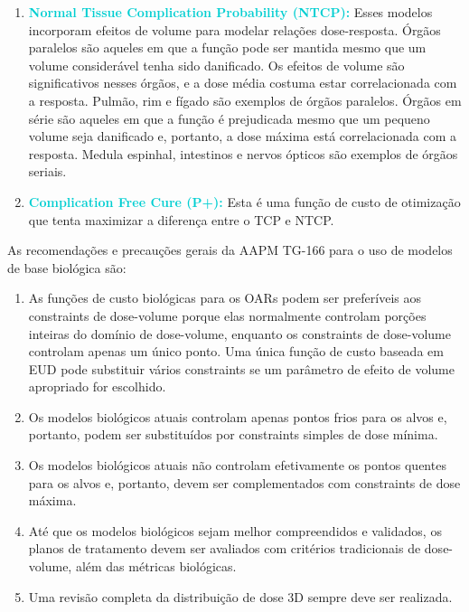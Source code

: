 \documentclass[11pt,a4paper]{article}
\newcounter{exemplo}
\begin{document}
\begin{enumerate}
		\item \textcolor{DarkTurquoise}{\textbf{Normal Tissue Complication Probability (NTCP):}} Esses modelos incorporam efeitos de volume para modelar relações dose-resposta. Órgãos paralelos são aqueles em que a função pode ser mantida mesmo que um volume considerável tenha sido danificado. Os efeitos de volume são significativos nesses órgãos, e a dose média costuma estar correlacionada com a resposta. Pulmão, rim e fígado são exemplos de órgãos paralelos. Órgãos em série são aqueles em que a função é prejudicada mesmo que um pequeno volume seja danificado e, portanto, a dose máxima está correlacionada com a resposta. Medula espinhal, intestinos e nervos ópticos são exemplos de órgãos seriais.
		
		\item \textcolor{DarkTurquoise}{\textbf{Complication Free Cure (P+):}} Esta é uma função de custo de otimização que tenta maximizar a diferença entre o TCP e NTCP. 
	\end{enumerate}

	As recomendações e precauções gerais da AAPM TG-166 para o uso de modelos de base biológica são:

	\begin{enumerate}[label=\textcolor{CarnationPink}{(\roman*)}]
		\item As funções de custo biológicas para os OARs podem ser preferíveis aos constraints de dose-volume porque elas normalmente controlam porções inteiras do domínio de dose-volume, enquanto os constraints de dose-volume controlam apenas um único ponto. Uma única função de custo baseada em EUD pode substituir vários constraints se um parâmetro de efeito de volume apropriado for escolhido.
		\item Os modelos biológicos atuais controlam apenas pontos frios para os alvos e, portanto, podem ser substituídos por constraints simples de dose mínima.
		\item Os modelos biológicos atuais não controlam efetivamente os pontos quentes para os alvos e, portanto, devem ser complementados com constraints de dose máxima.
		\item Até que os modelos biológicos sejam melhor compreendidos e validados, os planos de tratamento devem ser avaliados com critérios tradicionais de dose-volume, além das métricas biológicas.
		\item Uma revisão completa da distribuição de dose 3D sempre deve ser realizada.
	\end{enumerate}
\end{document}
